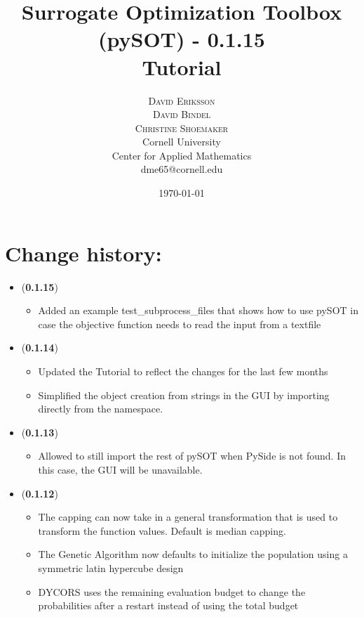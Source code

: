 \documentclass[]{article}
\title{\vspace{-15mm}%
	\fontsize{18pt}{10pt}\selectfont
	\textbf{Surrogate Optimization Toolbox (pySOT) - 0.1.15 \\ Tutorial}
	}
\author{%
	\Large\textsc{David Eriksson} \\[2mm]
	\Large\textsc{David Bindel} \\[2mm]
	\Large\textsc{Christine Shoemaker} \\[2mm]
		\normalsize	Cornell University \\
	\normalsize Center for Applied Mathematics \\
	\normalsize	dme65@cornell.edu \\ 
	}
\date{\today}
\begin{document}
\fontsize{12}{14}\rm

\maketitle
\thispagestyle{fancy}
\tableofcontents
\newpage

\section{Change history:}
\begin{itemize}

\item (\textbf{0.1.15})
\begin{itemize}
\item Added an example test\_subprocess\_files that shows how to use pySOT in case the objective function needs to read the input from a textfile
\end{itemize}

\item (\textbf{0.1.14}) 
\begin{itemize}
\item Updated the Tutorial to reflect the changes for the last few months
\item Simplified the object creation from strings in the GUI by importing directly from the namespace.
\end{itemize}

\item (\textbf{0.1.13}) 
\begin{itemize}
\item Allowed to still import the rest of pySOT when PySide is not found. In this case, the GUI will be unavailable.
\end{itemize}

\item (\textbf{0.1.12}) 
\begin{itemize}
\item The capping can now take in a general transformation that is used to transform the function values. Default is median capping.
\item The Genetic Algorithm now defaults to initialize the population using a symmetric latin hypercube design
\item DYCORS uses the remaining evaluation budget to change the probabilities after a restart instead of using the total budget 
\end{itemize}


\end{itemize}
\end{document}
